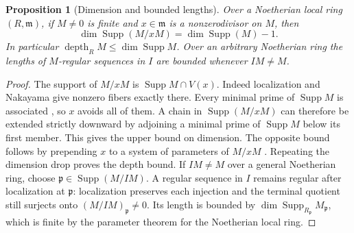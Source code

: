 \documentclass[11pt,oneside,openany]{book}
\newtheorem{proposition}[theorem]{Proposition}
\theoremstyle{definition}
\theoremstyle{remark}
\begin{document}
\begin{proposition}[Dimension and bounded lengths]\label{res:DP-02}
Over a Noetherian local ring $(R,\mathfrak m)$, if $M\ne0$ is finite
and $x\in\mathfrak m$ is a nonzerodivisor on $M$, then
\[
 \dim\operatorname{Supp}(M/xM)=\dim\operatorname{Supp}(M)-1.
\]
In particular $\operatorname{depth}_R M\le\dim\operatorname{Supp}M$.
Over an arbitrary Noetherian ring the lengths of $M$-regular sequences
in $I$ are bounded whenever $IM\ne M$.
\end{proposition}
\begin{proof}
The support of $M/xM$ is $\operatorname{Supp}M\cap V(x)$.
Indeed localization and Nakayama give nonzero fibers exactly there.
Every minimal prime of $\operatorname{Supp}M$ is associated
\cite[Theorem ALG-05-C02-R03]{p103}, so $x$ avoids all of them.
A chain in $\operatorname{Supp}(M/xM)$ can therefore be extended
strictly downward by adjoining a minimal prime of
$\operatorname{Supp}M$ below its first member. This gives the upper
bound on dimension. The opposite bound follows by prepending $x$
to a system of parameters of $M/xM$
\cite[Theorem ALG-05-C03-S01]{p103}. Repeating the dimension drop proves
the depth bound. If $IM\ne M$ over a general Noetherian ring, choose
$\mathfrak p\in\operatorname{Supp}(M/IM)$. A regular sequence in $I$
remains regular after localization at $\mathfrak p$: localization
preserves each injection and the terminal quotient still surjects
onto $(M/IM)_{\mathfrak p}\ne0$. Its length is bounded by
$\dim\operatorname{Supp}_{R_{\mathfrak p}}M_{\mathfrak p}$, which is
finite by the parameter theorem for the Noetherian local ring.
\end{proof}
\end{document}
